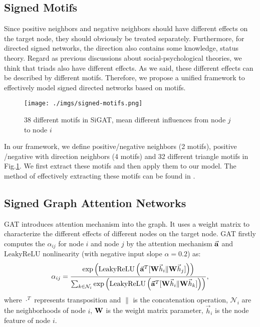 \documentclass[runningheads]{llncs}
\begin{document}
\subsection{Signed Motifs}

Since positive neighbors and negative neighbors should have different effects on the target node, they should obviously be treated separately.
Furthermore, for directed signed networks, the direction also contains some knowledge, \eg status theory.
Regard as previous discussions about social-psychological theories, we think that triads also have different effects. 
As we said, these different effects can be described by different motifs.
Therefore, we propose a unified framework to effectively model signed directed networks based on motifs.

\begin{figure}[H]
    \centering
    \texttt{[image: ./imgs/signed-motifs.png]}
    \caption{38 different motifs in SiGAT, mean different influences from node $j$ to node $i$} 
    \label{fig:motifs}
    \vspace{-10px}
\end{figure}

In our framework, we define positive/negative neighbors (2 motifs), positive /negative with direction neighbors (4 motifs) and 32 different triangle motifs in Fig.\ref{fig:motifs}. 
We first extract these motifs and then apply them to our model. The method of effectively extracting these motifs can be found in \cite{schank2005finding}.



\subsection{Signed Graph Attention Networks}
GAT\cite{velickovic2017graph} introduces attention mechanism into the graph.
It uses a weight matrix to characterize the different effects of different nodes on the target node.
GAT firstly computes the $\alpha_{ij}$ for node $i$ and node $j$ by the attention mechanism $\vec{\bf a}$ and $\text{LeakyReLU}$ nonlinearity (with negative input slope $\alpha = 0.2$) as:
\begin{equation}
    \label{eq:gat1}
    \alpha_{ij} = \frac{\exp\left(\text{LeakyReLU}\left(\vec{\bf a}^T[{\bf W}\vec{h}_i\|{\bf W}\vec{h}_j]\right)\right)}{\sum_{k\in\mathcal{N}_i} \exp\left(\text{LeakyReLU}\left(\vec{\bf a}^T[{\bf W}\vec{h}_i\|{\bf W}\vec{h}_k]\right)\right)},
\end{equation}
where $\cdot^T$ represents transposition and $\|$ is the concatenation operation, $\mathcal{N}_i$ are the neighborhoods of node $i$, $\bf W$ is the weight matrix parameter, $\vec{h}_i$ is the node feature of node $i$.
\end{document}
